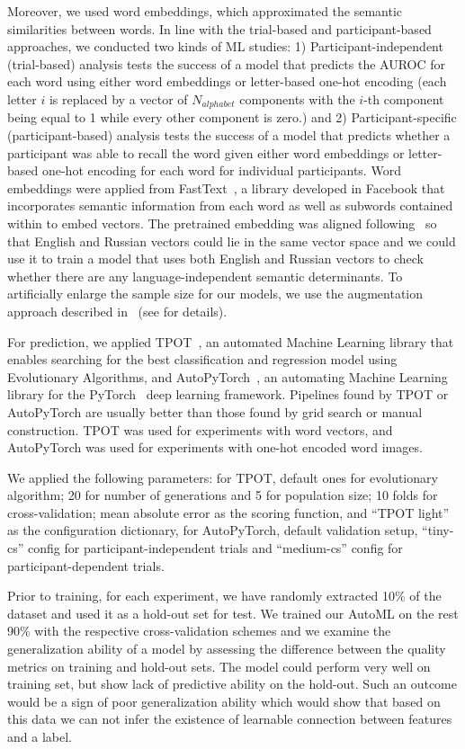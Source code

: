 \documentclass[10pt,letterpaper]{article}
\begin{document}
Moreover, we used word embeddings, which approximated the semantic similarities between words. In line with the trial-based and participant-based approaches, we conducted two kinds of ML studies: 1) Participant-independent (trial-based) analysis tests the success of a model that predicts the AUROC for each word using either word embeddings or letter-based one-hot encoding (each letter \(i\) is replaced by a vector of \(N_{alphabet}\) components with the \(i\)-th component being equal to 1 while every other component is zero.) and 2) Participant-specific (participant-based) analysis tests the success of a model that predicts whether a participant was able to recall the word given either word embeddings or letter-based one-hot encoding for each word for individual participants. Word embeddings were applied from FastText~\cite{bojanowski2017enriching}, a library developed in Facebook that incorporates semantic information from each word as well as subwords contained within to embed vectors.  The pretrained embedding was aligned following~\cite{joulin2018loss} so that English and Russian vectors could lie in the same vector space and we could use it to train a model that uses both English and Russian vectors to check whether there are any language-independent semantic determinants. To artificially enlarge the sample size for our models, we use the augmentation approach described in~\cite{zhang2018word} (see  for details). 

For prediction, we applied TPOT~\cite{olson2019tpot}, an automated Machine Learning library that enables searching for the best classification and regression model using Evolutionary Algorithms, and AutoPyTorch~\cite{mendoza2019towards}, an automating Machine Learning library for the PyTorch~\cite{paszke2017automatic} deep learning framework. Pipelines found by TPOT or AutoPyTorch are usually better than those found by grid search or manual construction. TPOT was used for experiments with word vectors, and AutoPyTorch was used for experiments with one-hot encoded word images.

We applied the following parameters: for TPOT, default ones for evolutionary algorithm; 20 for number of generations and 5 for population size; 10 folds for cross-validation; mean absolute error as the scoring function, and ``TPOT light'' as the configuration dictionary, for AutoPyTorch, default validation setup, ``tiny-cs'' config for participant-independent trials and ``medium-cs'' config for participant-dependent trials. 

Prior to training, for each experiment, we have randomly extracted 10\% of the dataset and used it as a hold-out set for test. We trained our AutoML on the rest 90\% with the respective cross-validation schemes and we examine the generalization ability of a model by assessing the difference between the quality metrics on training and hold-out sets. The model could perform very well on training set, but show lack of predictive ability on the hold-out. Such an outcome would be a sign of poor generalization ability which would show that based on this data we can not infer the existence of learnable connection between features and a label.
\end{document}
